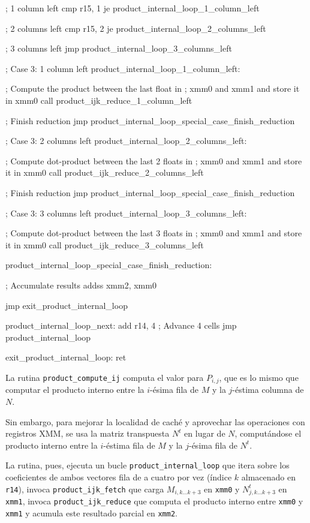 \documentclass[a4paper, 10pt, twoside]{article}
\newcommand{\cc}[1]{\texttt{#1}}
\begin{document}
\begin{code}
    ; 1 column left
    cmp r15, 1
    je product_internal_loop_1_column_left

    ; 2 columns left
    cmp r15, 2
    je product_internal_loop_2_columns_left

    ; 3 columns left
    jmp product_internal_loop_3_columns_left

    ; Case 3: 1 column left
  product_internal_loop_1_column_left:

    ; Compute the product between the last float in
    ; xmm0 and xmm1 and store it in xmm0
    call product_ijk_reduce_1_column_left

    ; Finish reduction
    jmp product_internal_loop_special_case_finish_reduction

    ; Case 3: 2 columns left
  product_internal_loop_2_columns_left:

    ; Compute dot-product between the last 2 floats in
    ; xmm0 and xmm1 and store it in xmm0
    call product_ijk_reduce_2_columns_left

    ; Finish reduction
    jmp product_internal_loop_special_case_finish_reduction

    ; Case 3: 3 columns left
  product_internal_loop_3_columns_left:

    ; Compute dot-product between the last 3 floats in
    ; xmm0 and xmm1 and store it in xmm0
    call product_ijk_reduce_3_columns_left

  product_internal_loop_special_case_finish_reduction:

    ; Accumulate results
    addss xmm2, xmm0

    jmp exit_product_internal_loop

  product_internal_loop_next:
    add r14, 4               ; Advance 4 cells
    jmp product_internal_loop

  exit_product_internal_loop:
    ret
\end{code}

La rutina \cc{product\_compute\_ij} computa el valor para $P_{i,j}$, que es lo
mismo que computar el producto interno entre la $i$-ésima fila de $M$ y la
$j$-éstima columna de $N$.

Sin embargo, para mejorar la localidad de caché y aprovechar las operaciones
con registros XMM, se usa la matriz transpuesta $N^t$ en lugar de $N$,
computándose el producto interno entre la $i$-éstima fila de $M$ y la $j$-ésima
fila de $N^t$.

La rutina, pues, ejecuta un bucle \cc{product\_internal\_loop} que itera sobre
los coeficientes de ambos vectores fila de a cuatro por vez (índice $k$
almacenado en \cc{r14}), invoca \cc{product\_ijk\_fetch} que carga $M_{i,k
\ldots k+3}$ en \cc{xmm0} y $N^{t}_{j,k \ldots k+3}$ en \cc{xmm1}, invoca
\cc{product\_ijk\_reduce} que computa el producto interno entre \cc{xmm0} y
\cc{xmm1} y acumula este resultado parcial en \cc{xmm2}.
\end{document}
